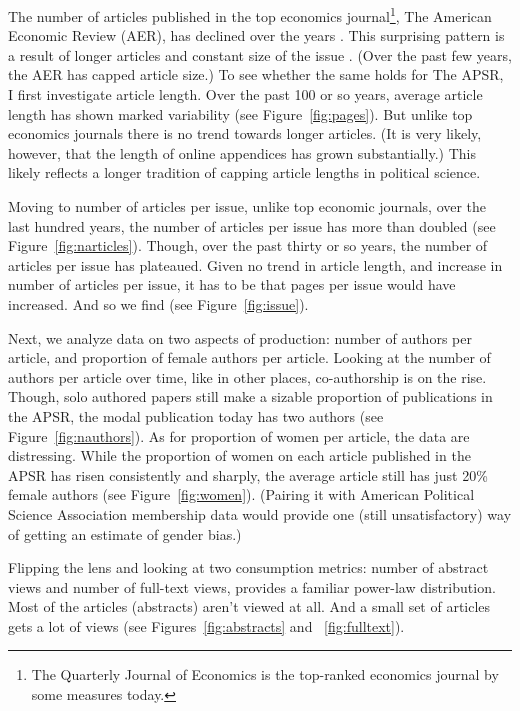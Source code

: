 \documentclass[12pt]{article}
\begin{document}
The number of articles published in the top economics journal\footnote{The Quarterly Journal of Economics is the top-ranked economics journal by some measures today.}, The American Economic Review (AER), has declined over the years \citep{card2014page}. This surprising pattern is a result of longer articles and constant size of the issue \citet{card2014page}. (Over the past few years, the AER has capped article size.) To see whether the same holds for The APSR, I first investigate article length. Over the past 100 or so years, average article length has shown marked variability (see Figure~\ref{fig:pages}). But unlike top economics journals there is no trend towards longer articles. (It is very likely, however, that the length of online appendices has grown substantially.) This likely reflects a longer tradition of capping article lengths in political science.

Moving to number of articles per issue, unlike top economic journals, over the last hundred years, the number of articles per issue has more than doubled (see Figure~\ref{fig:narticles}). Though, over the past thirty or so years, the number of articles per issue has plateaued. Given no trend in article length, and increase in number of articles per issue, it has to be that pages per issue would have increased. And so we find (see Figure~\ref{fig:issue}). 

Next, we analyze data on two aspects of production: number of authors per article, and proportion of female authors per article. Looking at the number of authors per article over time, like in other places, co-authorship is on the rise. Though, solo authored papers still make a sizable proportion of publications in the APSR, the modal publication today has two authors (see Figure~\ref{fig:nauthors}). As for proportion of women per article, the data are distressing. While the proportion of women on each article published in the APSR has risen consistently and sharply, the average article still has just 20\% female authors (see Figure~\ref{fig:women}). (Pairing it with American Political Science Association membership data would provide one (still unsatisfactory) way of getting an estimate of gender bias.)

Flipping the lens and looking at two consumption metrics: number of abstract views and number of full-text views, provides a familiar power-law distribution. Most of the articles (abstracts) aren't viewed at all. And a small set of articles gets a lot of views (see Figures~\ref{fig:abstracts} and ~\ref{fig:fulltext}).
\end{document}
